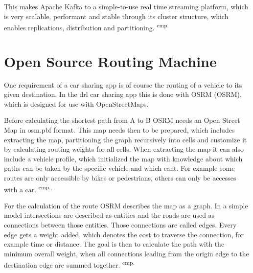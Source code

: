 This makes Apache Kafka to a simple-to-use real time streaming platform, which is very scalable, performant and stable through its cluster structure, which enables replications, distribution and partitioning. \textsuperscript{cmp.\cite{28}}


\section{Open Source Routing Machine}

One requirement of a car sharing app is of course the routing of a vehicle to its given destination. In the drl car sharing app this is done with \acs{OSRM} (\acl{OSRM}), which is designed for use with OpenStreetMaps.

Before calculating the shortest path from A to B OSRM needs an Open Street Map in osm.pbf format. This map needs then to be prepared, which includes extracting the map, partitioning the graph recursively into cells and customize it by calculating routing weights for all cells. When extracting the map it can also include a vehicle profile, which initialized the map with knowledge about which paths can be taken by the specific vehicle and which cant. For example some routes are only accessible by bikes or pedestrians, others can only be accesses with a car.  \textsuperscript{cmp.\cite{29}, \cite{30}}


For the calculation of the route OSRM describes the map as a graph. In a simple model intersections are described as entities and the roads are used as connections between those entities. Those connections are called edges. Every edge gets a weight added, which denotes the cost to traverse the connection, for example time or distance. The goal is then to calculate the path with the minimum overall weight, when all connections leading from the origin edge to the destination edge are summed together. \textsuperscript{cmp.\cite{31}}



